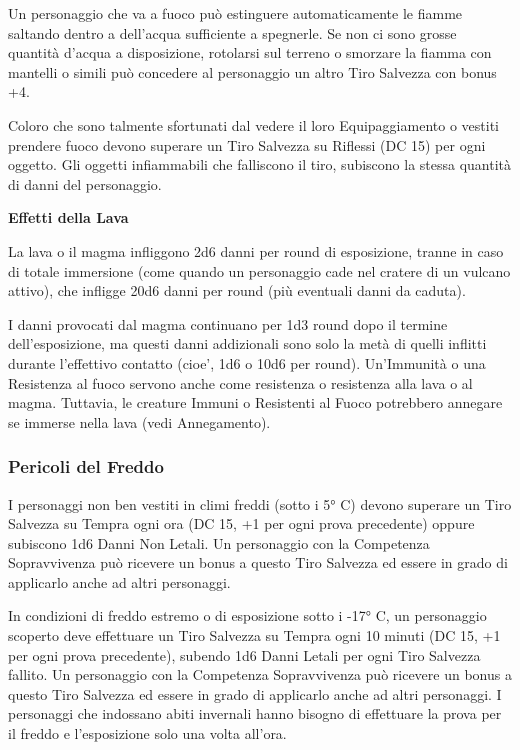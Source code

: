 \documentclass[a4paper,11pt,twoside,openany]{book}
\begin{document}
Un personaggio che va a fuoco può estinguere automaticamente le fiamme saltando dentro a dell'acqua sufficiente a spegnerle. Se non ci sono grosse quantità d'acqua a disposizione, rotolarsi sul terreno o smorzare la fiamma con mantelli o simili può concedere al personaggio un altro Tiro Salvezza con bonus +4.

Coloro che sono talmente sfortunati dal vedere il loro Equipaggiamento o vestiti prendere fuoco devono superare un Tiro Salvezza su Riflessi (DC 15) per ogni oggetto. Gli oggetti infiammabili che falliscono il tiro, subiscono la stessa quantità di danni del personaggio.

\medskip

\textbf{Effetti della Lava}

La lava o il magma infliggono 2d6 danni per round di esposizione, tranne in caso di totale immersione (come quando un personaggio cade nel cratere di un vulcano attivo), che infligge 20d6 danni per round (più eventuali danni da caduta).

I danni provocati dal magma continuano per 1d3 round dopo il termine dell'esposizione, ma questi danni addizionali sono solo la metà di quelli inflitti durante l'effettivo contatto (cioe', 1d6 o 10d6 per round). Un'Immunità o una Resistenza al fuoco servono anche come resistenza o resistenza alla lava o al magma. Tuttavia, le creature Immuni o Resistenti al Fuoco potrebbero annegare se immerse nella lava (vedi Annegamento).


\subsubsection{Pericoli del Freddo}

\label{pericoli-del-freddo}

I personaggi non ben vestiti in climi freddi (sotto i 5° C) devono superare un Tiro Salvezza su Tempra ogni ora (DC 15, +1 per ogni prova precedente) oppure subiscono 1d6 Danni Non Letali. Un personaggio con la Competenza Sopravvivenza può ricevere un bonus a questo Tiro Salvezza ed essere in grado di applicarlo anche ad altri personaggi.

In condizioni di freddo estremo o di esposizione sotto i -17° C, un personaggio scoperto deve effettuare un Tiro Salvezza su Tempra ogni 10 minuti (DC 15, +1 per ogni prova precedente), subendo 1d6 Danni Letali per ogni Tiro Salvezza fallito. Un personaggio con la Competenza Sopravvivenza può ricevere un bonus a questo Tiro Salvezza ed essere in grado di applicarlo anche ad altri personaggi. I personaggi che indossano abiti invernali hanno bisogno di effettuare la prova per il freddo e l'esposizione solo una volta all'ora.
\end{document}
